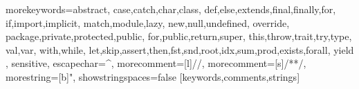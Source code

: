 


\newcommand{\cbox}[1]{\colorbox{aliceblue}{#1}}

%
{morekeywords={abstract,%
  case,catch,char,class,%
  def,else,extends,final,finally,for,%
  if,import,implicit,%
  match,module,lazy,%
  new,null,undefined,%
  override,%
  package,private,protected,public,%
  for,public,return,super,%
  this,throw,trait,try,type,%
  val,var,%
  with,while,%
  let,skip,assert,then,fst,snd,root,idx,sum,prod,exists,forall,%
  yield%
  },%
  sensitive,%
  escapechar=^,
  morecomment=[l]//,%
  morecomment=[s]{/*}{*/},%
  morestring=[b]",%
  showstringspaces=false%
}[keywords,comments,strings]%



\newcommand{\commentstyle}[1]{\color{ccomment}\itshape{#1}}
\newcommand{\keywordstyle}[1]{\color{ckeyword}\bfseries{#1}}
\newcommand{\stringstyle}[1]{\color{cstring}\bfseries{#1}}



